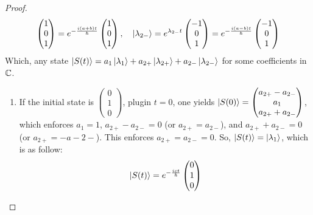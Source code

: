 \documentclass{article}
\begin{document}
\begin{proof}
\begin{align}
\begin{pmatrix}
            1\\0\\1
        \end{pmatrix} = e^{-\frac{i(a+b)t}{\hbar}}\begin{pmatrix}
            1\\0\\1
        \end{pmatrix},\quad \ket{\lambda_{2-}}=e^{\lambda_{2-}t}\begin{pmatrix}
            -1\\0\\1
        \end{pmatrix} = e^{-\frac{i(a-b)t}{\hbar}}\begin{pmatrix}
            -1\\0\\1
        \end{pmatrix}
    \end{align}
    Which, any state $\ket{S(t)} = a_1 \ket{\lambda_1}+a_{2+}\ket{\lambda_{2+}}+a_{2-}\ket{\lambda_{2-}}$ for some coefficients in $\mathbb{C}$.

    \hfil

    \begin{enumerate}
        \item If the initial state is $\begin{pmatrix}
            0\\1\\0
        \end{pmatrix}$, plugin $t=0$, one yields $\ket{S(0)} = \begin{pmatrix}
            a_{2+}-a_{2-}\\a_1\\a_{2+}+a_{2-}
        \end{pmatrix}$, which enforces $a_1=1$, $a_{2+}-a_{2-}=0$ (or $a_{2+}=a_{2-}$), and $a_{2+}+a_{2-}=0$ (or $a_{2+}=-a-{2-}$). This enforces $a_{2+}=a_{2-}=0$. So, $\ket{S(t)} = \ket{\lambda_1}$, which is as follow:
        \begin{align}
            \ket{S(t)}=e^{-\frac{ict}{\hbar}}\begin{pmatrix}
                0\\1\\0
            \end{pmatrix}
        \end{align}

        \hfil


\end{enumerate}
\end{proof}
\end{document}
